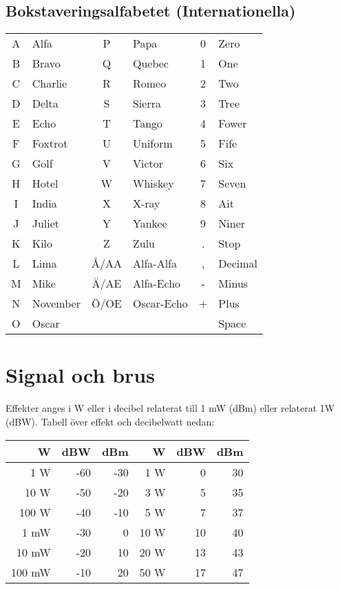 \subsection{Bokstaveringsalfabetet (Internationella)}
\begin{center}
\begin{tabular}{cl|cl|cl}
	A & Alfa     &  P   & Papa       & 0 & Zero    \\
	B & Bravo    &  Q   & Quebec     & 1 & One     \\
	C & Charlie  &  R   & Romeo      & 2 & Two     \\
	D & Delta    &  S   & Sierra     & 3 & Tree    \\
	E & Echo     &  T   & Tango      & 4 & Fower   \\
	F & Foxtrot  &  U   & Uniform    & 5 & Fife    \\
	G & Golf     &  V   & Victor     & 6 & Six     \\
	H & Hotel    &  W   & Whiskey    & 7 & Seven   \\
	I & India    &  X   & X-ray      & 8 & Ait     \\
	J & Juliet   &  Y   & Yankee     & 9 & Niner   \\
	K & Kilo     &  Z   & Zulu       & . & Stop    \\
	L & Lima     & Å/AA & Alfa-Alfa  & , & Decimal \\
	M & Mike     & Ä/AE & Alfa-Echo  & - & Minus   \\
	N & November & Ö/OE & Oscar-Echo & + & Plus    \\
	O & Oscar    &      &            &   & Space
\end{tabular}
\end{center}

\section{Signal och brus}

Effekter anges i W eller i decibel relaterat till 1 mW (dBm) eller relaterat 1W (dBW). Tabell över effekt och decibelwatt nedan:
\begin{center}
\begin{tabular}{rrr|rrr}
	            \textbf{W} & \textbf{dBW} & \textbf{dBm} &    \textbf{W} & \textbf{dBW} & \textbf{dBm} \\ \hline
	  1 \textmu W & -60 & -30 &  1 W &   0 &  30 \\
	 10 \textmu W & -50 & -20 &  3 W &   5 &  35 \\
	100 \textmu W & -40 & -10 &  5 W &   7 &  37 \\
	         1 mW & -30 &   0 & 10 W &  10 &  40 \\
	        10 mW & -20 &  10 & 20 W &  13 &  43 \\
	       100 mW & -10 &  20 & 50 W &  17 &  47
\end{tabular}
\end{center}

